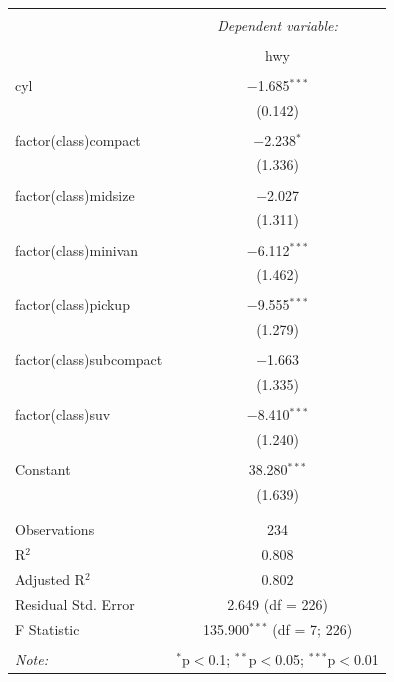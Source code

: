 \documentclass[12pt,]{article}
\begin{document}
\begin{table}[!htbp] \centering 
  \caption{} 
  \label{} 
\begin{tabular}{@{\extracolsep{5pt}}lc} 
\\[-1.8ex]\hline 
\hline \\[-1.8ex] 
 & \multicolumn{1}{c}{\textit{Dependent variable:}} \\ 
\cline{2-2} 
\\[-1.8ex] & hwy \\ 
\hline \\[-1.8ex] 
 cyl & $-$1.685$^{***}$ \\ 
  & (0.142) \\ 
  & \\ 
 factor(class)compact & $-$2.238$^{*}$ \\ 
  & (1.336) \\ 
  & \\ 
 factor(class)midsize & $-$2.027 \\ 
  & (1.311) \\ 
  & \\ 
 factor(class)minivan & $-$6.112$^{***}$ \\ 
  & (1.462) \\ 
  & \\ 
 factor(class)pickup & $-$9.555$^{***}$ \\ 
  & (1.279) \\ 
  & \\ 
 factor(class)subcompact & $-$1.663 \\ 
  & (1.335) \\ 
  & \\ 
 factor(class)suv & $-$8.410$^{***}$ \\ 
  & (1.240) \\ 
  & \\ 
 Constant & 38.280$^{***}$ \\ 
  & (1.639) \\ 
  & \\ 
\hline \\[-1.8ex] 
Observations & 234 \\ 
R$^{2}$ & 0.808 \\ 
Adjusted R$^{2}$ & 0.802 \\ 
Residual Std. Error & 2.649 (df = 226) \\ 
F Statistic & 135.900$^{***}$ (df = 7; 226) \\ 
\hline 
\hline \\[-1.8ex] 
\textit{Note:}  & \multicolumn{1}{r}{$^{*}$p$<$0.1; $^{**}$p$<$0.05; $^{***}$p$<$0.01} \\ 
\end{tabular} 
\end{table}




\newpage
\singlespacing
\printbibliography[title=Bibliography]
\end{document}
